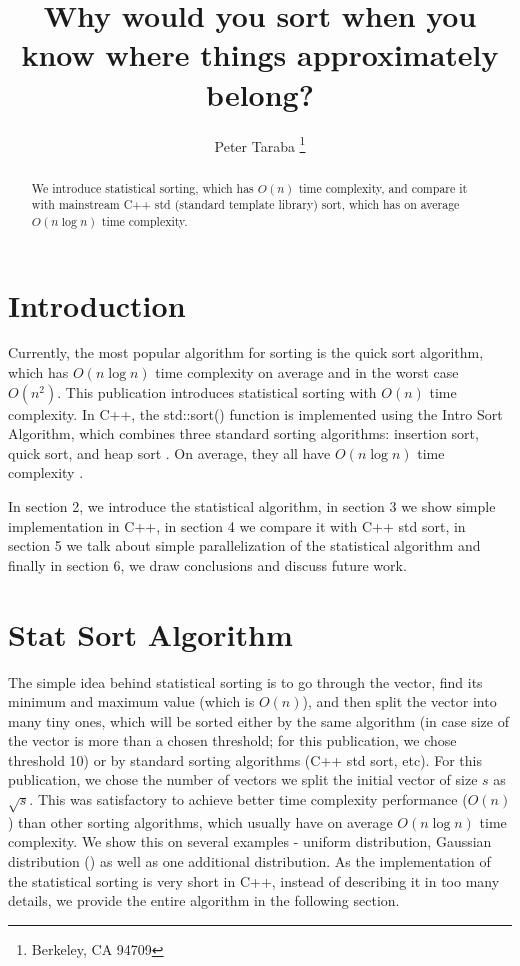 \documentclass[12pt]{article}
\title{Why would you sort when you know where things approximately belong?}
\author{Peter Taraba \footnote{Berkeley, CA 94709}}
\begin{document}
	
	\maketitle
	
	\begin{abstract}
  		We introduce statistical sorting, which has $O(n)$ time complexity, and compare it with mainstream C++ std (standard template library) sort, which has on average $O(n \log n)$ time complexity.
	\end{abstract}
	
	\section{Introduction}
	
		Currently, the most popular algorithm for sorting is the quick sort algorithm, which has $O(n \log n)$ time complexity on average and in the worst case $O(n^2)$. This publication introduces statistical sorting with $O(n)$ time complexity. In C++, the std::sort() function is implemented using the Intro Sort Algorithm, which combines three standard sorting algorithms: insertion sort, quick sort, and heap sort \cite{cppsort}. On average, they all have $O(n \log n)$ time complexity \cite{wikisort}.
		
		In section 2, we introduce the statistical algorithm, in section 3 we show simple implementation in C++, in section 4 we compare it with C++ std sort, in section 5 we talk about simple parallelization of the statistical algorithm and finally in section 6, we draw conclusions and discuss future work.

	\section{Stat Sort Algorithm}
	
		The simple idea behind statistical sorting is to go through the vector, find its minimum and maximum value (which is $O(n)$), and then split the vector into many tiny ones, which will be sorted either by the same algorithm (in case size of the vector is more than a chosen threshold; for this publication, we chose threshold 10) or by standard sorting algorithms (C++ std sort, etc). For this publication, we chose the number of vectors we split the initial vector of size $s$ as $\sqrt{s}$. This was satisfactory to achieve better time complexity performance ($O(n)$) than other sorting algorithms, which usually have on average $O(n \log n)$ time complexity. We show this on several examples - uniform distribution, Gaussian distribution (\cite{gauss}) as well as one additional distribution. As the implementation of the statistical sorting is very short in C++, instead of describing it in too many details, we provide the entire algorithm in the following section.
		
\end{document}
